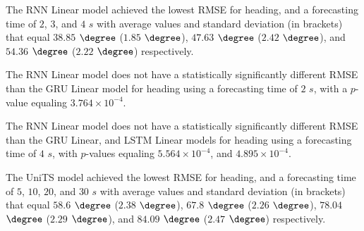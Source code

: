 \begin{table}[!ht]
	\centering
	\caption{The average RMSE, with standard deviation in brackets, across $k$-fold validation datasets for the heading estimated on the $k$-fold testing datasets by different RNN models, and forecasting times.}
	\label{tab:best_direction_RMSE}
\end{table}

The RNN Linear model achieved the lowest RMSE for heading, and a forecasting time of $2$, $3$, and $4$ $s$ with average values and standard deviation (in brackets) that equal $38.85$ $\degree$ ($1.85$ $\degree$), $47.63$ $\degree$ ($2.42$ $\degree$), and $54.36$ $\degree$ ($2.22$ $\degree$) respectively.

The RNN Linear model does not have a statistically significantly different RMSE than the GRU Linear model for heading using a forecasting time of $2$ $s$, with a $p$-value equaling $3.764 \times 10^{-4}$.

The RNN Linear model does not have a statistically significantly different RMSE than the GRU Linear, and LSTM Linear models for heading using a forecasting time of $4$ $s$, with $p$-values equaling $5.564 \times 10^{-4}$, and $4.895 \times 10^{-4}$.

The UniTS model achieved the lowest RMSE for heading, and a forecasting time of $5$, $10$, $20$, and $30$ $s$ with average values and standard deviation (in brackets) that equal $58.6$ $\degree$ ($2.38$ $\degree$), $67.8$ $\degree$ ($2.26$ $\degree$), $78.04$ $\degree$ ($2.29$ $\degree$), and $84.09$ $\degree$ ($2.47$ $\degree$) respectively.

